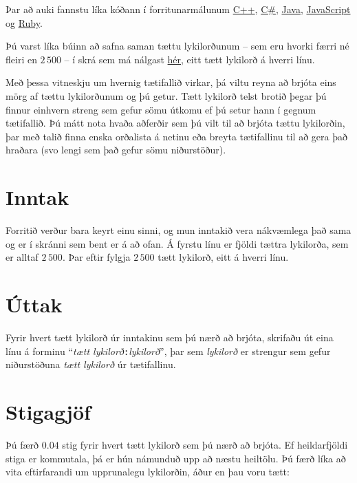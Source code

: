 Þar að auki fannstu líka kóðann í forritunarmálunum
\href{/problems/iceland.gagnaleki/file/statement/attachments/taeta.cpp}{C++},
\href{/problems/iceland.gagnaleki/file/statement/attachments/Taeta.cs}{C\#},
\href{/problems/iceland.gagnaleki/file/statement/attachments/Taeta.java}{Java},
\href{/problems/iceland.gagnaleki/file/statement/attachments/taeta.js}{JavaScript} og
\href{/problems/iceland.gagnaleki/file/statement/attachments/taeta.rb}{Ruby}.

Þú varst líka búinn að safna saman tættu lykilorðunum -- sem eru hvorki færri
né fleiri en $2\,500$ -- í skrá sem má nálgast
\href{/problems/iceland.gagnaleki/file/statement/attachments/gagnaleki.txt}{hér},
eitt tætt lykilorð á hverri línu.

Með þessa vitneskju um hvernig tætifallið virkar, þá viltu reyna að brjóta eins
mörg af tættu lykilorðunum og þú getur. Tætt lykilorð telst brotið þegar þú
finnur einhvern streng sem gefur sömu útkomu ef þú setur hann í gegnum
tætifallið. Þú mátt nota hvaða aðferðir sem þú vilt til að brjóta tættu
lykilorðin, þar með talið finna enska orðalista á netinu eða breyta tætifallinu
til að gera það hraðara (svo lengi sem það gefur sömu niðurstöður).

\section*{Inntak}
Forritið verður bara keyrt einu sinni, og mun inntakið vera nákvæmlega það sama
og er í skránni sem bent er á að ofan. Á fyrstu línu er fjöldi tættra
lykilorða, sem er alltaf $2\,500$. Þar eftir fylgja $2\,500$ tætt lykilorð,
eitt á hverri línu.

\section*{Úttak}
Fyrir hvert tætt lykilorð úr inntakinu sem þú nærð að brjóta, skrifaðu út eina
línu á forminu ``\textit{tætt lykilorð}\texttt{:}\textit{lykilorð}'', þar sem
\textit{lykilorð} er strengur sem gefur niðurstöðuna \textit{tætt lykilorð} úr
tætifallinu.

\section*{Stigagjöf}
Þú færð $0.04$ stig fyrir hvert tætt lykilorð sem þú nærð að brjóta. Ef
heildarfjöldi stiga er kommutala, þá er hún námunduð upp að næstu heiltölu. Þú
færð líka að vita eftirfarandi um upprunalegu lykilorðin, áður en þau voru
tætt:

